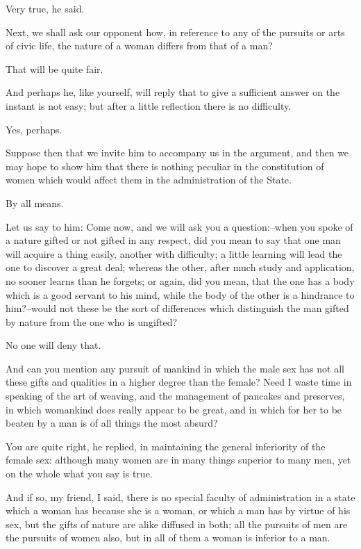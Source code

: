 Very true, he said.

Next, we shall ask our opponent how, in reference to any of the pursuits
or arts of civic life, the nature of a woman differs from that of a man?

That will be quite fair.

And perhaps he, like yourself, will reply that to give a sufficient
answer on the instant is not easy; but after a little reflection there
is no difficulty.

Yes, perhaps.

Suppose then that we invite him to accompany us in the argument, and
then we may hope to show him that there is nothing peculiar in the
constitution of women which would affect them in the administration of
the State.

By all means.

Let us say to him: Come now, and we will ask you a question:--when you
spoke of a nature gifted or not gifted in any respect, did you mean to
say that one man will acquire a thing easily, another with difficulty; a
little learning will lead the one to discover a great deal; whereas
the other, after much study and application, no sooner learns than he
forgets; or again, did you mean, that the one has a body which is a
good servant to his mind, while the body of the other is a hindrance to
him?--would not these be the sort of differences which distinguish the
man gifted by nature from the one who is ungifted?

No one will deny that.

And can you mention any pursuit of mankind in which the male sex has not
all these gifts and qualities in a higher degree than the female? Need
I waste time in speaking of the art of weaving, and the management of
pancakes and preserves, in which womankind does really appear to be
great, and in which for her to be beaten by a man is of all things the
most absurd?

You are quite right, he replied, in maintaining the general inferiority
of the female sex: although many women are in many things superior to
many men, yet on the whole what you say is true.

And if so, my friend, I said, there is no special faculty of
administration in a state which a woman has because she is a woman, or
which a man has by virtue of his sex, but the gifts of nature are alike
diffused in both; all the pursuits of men are the pursuits of women
also, but in all of them a woman is inferior to a man.

